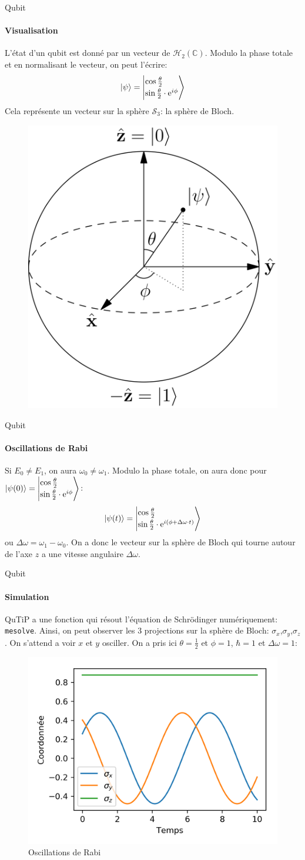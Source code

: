 \documentclass[11pt]{beamer}
\newcommand{\qb}[2]{\ensuremath{\left|\begin{matrix*}[l]
#1\\[2pt]#2
\end{matrix*}\right>}}
\begin{document}
\begin{frame}{Qubit}
\framesubtitle{Visualisation}
L'état d'un qubit est donné par un vecteur de $\mathcal{H}_2(\mathbb{C})$. Modulo la phase totale et en normalisant le vecteur, on peut l'écrire:
\[
\ket{\psi}=\qb{\cos{\frac{\theta}{2}}}{\sin{\frac{\theta}{2}}\cdot\textrm{e}^{i\phi}}
\]
Cela représente un vecteur sur la sphère $\mathcal{S}_3$: la sphère de Bloch.
\begin{figure}
\centering
\includegraphics[width=0.3\linewidth]{Bloch_diag}
\end{figure}
\end{frame}

\begin{frame}{Qubit}
\framesubtitle{Oscillations de Rabi}
Si $E_0\neq E_1$, on aura $\omega_0\neq \omega_1$. Modulo la phase totale, on aura donc pour  $\ket{\psi(0)}=\qb{\cos{\frac{\theta}{2}}}{\sin{\frac{\theta}{2}}\cdot\textrm{e}^{i\phi}}$:
\[
\ket{\psi(t)}=\qb{\cos{\frac{\theta}{2}}}{\sin{\frac{\theta}{2}}\cdot\textrm{e}^{i(\phi+\Delta\omega\cdot t)}}
\]
ou $\Delta\omega=\omega_1-\omega_0$.
On a donc le vecteur sur la sphère de Bloch qui tourne autour de l'axe $z$ a une vitesse angulaire $\Delta\omega$.
\end{frame}

\begin{frame}{Qubit}
\framesubtitle{Simulation}
QuTiP a une fonction qui résout l'équation de Schrödinger numériquement: \texttt{mesolve}.
Ainsi, on peut observer les 3 projections sur la sphère de Bloch: $\sigma_x$,$\sigma_y$,$\sigma_z$. On s'attend a voir $x$ et $y$ osciller. 
On a pris ici $\theta=\frac 12$ et $\phi=1$, $\hbar=1$ et $\Delta\omega=1$:

\begin{figure}
\centering
\includegraphics[width=0.7\linewidth]{pres_rabi}
\caption{Oscillations de Rabi}
\label{fig:presrabi}
\end{figure}
\end{frame}
\end{document}
